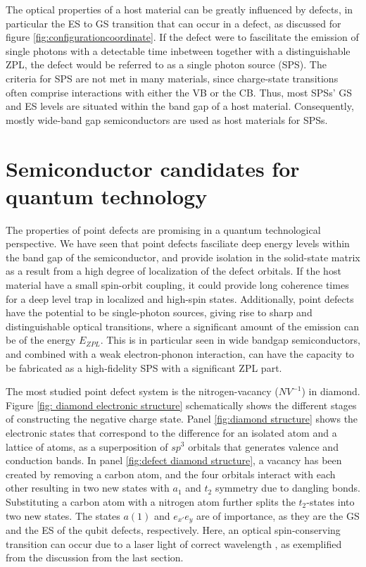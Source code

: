 The optical properties of a host material can be greatly influenced by defects, in particular the ES to GS transition that can occur in a defect, as discussed for figure \ref{fig:configurationcoordinate}. If the defect were to fascilitate the emission of single photons with a detectable time inbetween together with a distinguishable ZPL, the defect would be referred to as a single photon source (SPS). The criteria for SPS are not met in many materials, since charge-state transitions often comprise interactions with either the VB or the CB. Thus, most SPSs' GS and ES levels are situated within the band gap of a host material. Consequently, mostly wide-band gap semiconductors are used as host materials for SPSs.

\section{Semiconductor candidates for quantum technology}

The properties of point defects are promising in a quantum technological perspective. We have seen that point defects fasciliate deep energy levels within the band gap of the semiconductor, and provide isolation in the solid-state matrix as a result from a high degree of localization of the defect orbitals. If the host material have a small spin-orbit coupling, it could provide long coherence times for a deep level trap in localized and high-spin states. Additionally, point defects have the potential to be single-photon sources, giving rise to sharp and distinguishable optical transitions, where a significant amount of the emission can be of the energy $E_{ZPL}$. This is in particular seen in wide bandgap semiconductors, and combined with a weak electron-phonon interaction, can have the capacity to be fabricated as a high-fidelity SPS with a significant ZPL part.

The most studied point defect system is the nitrogen-vacancy ($NV^{-1}$) in diamond. Figure \ref{fig: diamond electronic structure} schematically shows the different stages of constructing the negative charge state. Panel \ref{fig:diamond structure} shows the electronic states that correspond to the difference for an isolated atom and a lattice of atoms, as a superposition of $sp^3$ orbitals that generates valence and conduction bands. In panel \ref{fig:defect diamond structure}, a vacancy has been created by removing a carbon atom, and the four orbitals interact with each other resulting in two new states with $a_1$ and $t_2$ symmetry due to dangling bonds. Substituting a carbon atom with a nitrogen atom further splits the $t_2$-states into two new states. The states $a(1)$ and $e_{x'}e_y$ are of importance, as they are the GS and the ES of the qubit defects, respectively. Here, an optical spin-conserving transition can occur due to a laser light of correct wavelength \cite{Gordon2013}, as exemplified from the discussion from the last section.

